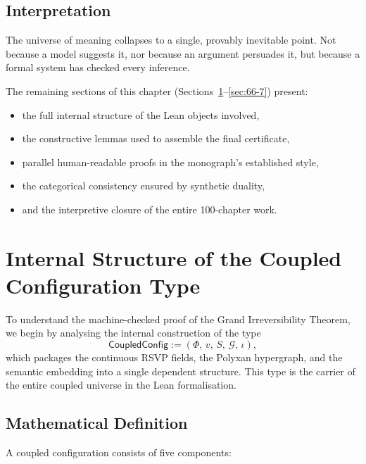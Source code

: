\subsection*{Interpretation}

The universe of meaning collapses to a single, provably inevitable point.
Not because a model suggests it, nor because an argument persuades it, but because a formal system has checked every inference.

\medskip

The remaining sections of this chapter (Sections~\ref{sec:66-2}--\ref{sec:66-7}) present:
\begin{itemize}
\item the full internal structure of the Lean objects involved,
\item the constructive lemmas used to assemble the final certificate,
\item parallel human-readable proofs in the monograph’s established style,
\item the categorical consistency ensured by synthetic duality,
\item and the interpretive closure of the entire 100-chapter work.
\end{itemize}

\section{Internal Structure of the Coupled Configuration Type}
\label{sec:66-2}

To understand the machine-checked proof of the Grand Irreversibility Theorem, we begin by analysing the internal construction of the type
\[
   \mathsf{CoupledConfig}
   := (\Phi,\, v,\, S,\, \mathcal{G},\, \iota),
\]
which packages the continuous RSVP fields, the Polyxan hypergraph, and the semantic embedding into a single dependent structure.
This type is the carrier of the entire coupled universe in the Lean formalisation.

\subsection{Mathematical Definition}

A coupled configuration consists of five components:

